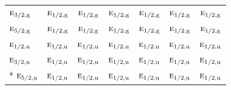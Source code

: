\documentclass[10pt,a4paper]{article}
\numberwithin{equation}{section}
\newcommand{\irr}[1]{\text{\normalfont\scshape #1}}
\newcommand{\ptag}[1]{\mathrm{#1}}
\begin{document}
{\begin{longtable}{@{}lcccccc@{}}
$\irr{e}_{3/2,\ptag{g}}$ & $\irr{e}_{1/2,\ptag{g}}$ & $\irr{e}_{1/2,\ptag{g}}$ & $\irr{e}_{1/2,\ptag{g}}$ & $\irr{e}_{1/2,\ptag{g}}$ & $\irr{e}_{1/2,\ptag{g}}$ & $\irr{e}_{1/2,\ptag{g}}$\\
$\irr{e}_{5/2,\ptag{g}}$ & $\irr{e}_{1/2,\ptag{g}}$ & $\irr{e}_{1/2,\ptag{g}}$ & $\irr{e}_{1/2,\ptag{g}}$ & $\irr{e}_{1/2,\ptag{g}}$ & $\irr{e}_{1/2,\ptag{g}}$ & $\irr{e}_{1/2,\ptag{g}}$\\
$\irr{e}_{1/2,\ptag{u}}$ & $\irr{e}_{1/2,\ptag{u}}$ & $\irr{e}_{1/2,\ptag{u}}$ & $\irr{e}_{1/2,\ptag{u}}$ & $\irr{e}_{1/2,\ptag{u}}$ & $\irr{e}_{1/2,\ptag{u}}$ & $\irr{e}_{1/2,\ptag{u}}$\\
$\irr{e}_{3/2,\ptag{u}}$ & $\irr{e}_{1/2,\ptag{u}}$ & $\irr{e}_{1/2,\ptag{u}}$ & $\irr{e}_{1/2,\ptag{u}}$ & $\irr{e}_{1/2,\ptag{u}}$ & $\irr{e}_{1/2,\ptag{u}}$ & $\irr{e}_{1/2,\ptag{u}}$\\*
$\irr{e}_{5/2,\ptag{u}}$ & $\irr{e}_{1/2,\ptag{u}}$ & $\irr{e}_{1/2,\ptag{u}}$ & $\irr{e}_{1/2,\ptag{u}}$ & $\irr{e}_{1/2,\ptag{u}}$ & $\irr{e}_{1/2,\ptag{u}}$ & $\irr{e}_{1/2,\ptag{u}}$\\
\bottomrule\end{longtable}}
\end{document}
